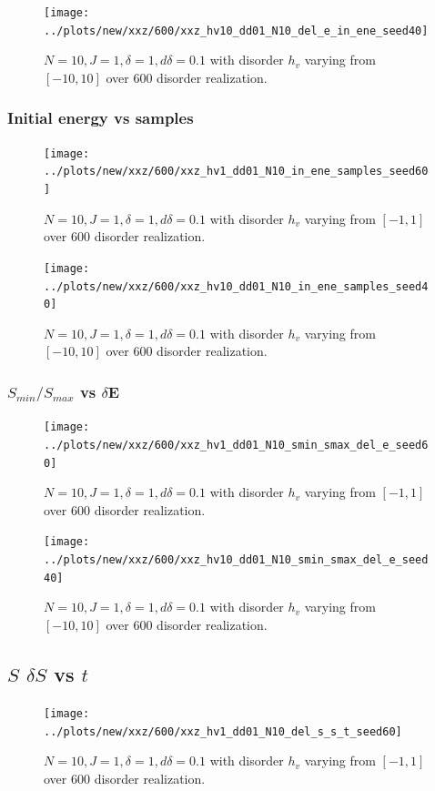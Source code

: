 \documentclass[a4paper]{article}
\begin{document}
\begin{figure}[h!]
  \centering
  \texttt{[image: ../plots/new/xxz/600/xxz\_hv10\_dd01\_N10\_del\_e\_in\_ene\_seed40]}
  \caption{$N = 10, J = 1, \delta = 1, d \delta =0.1$ with disorder $h_v$ varying from $[-10,10]$ over 600 disorder realization.}
  \label{fig:}
\end{figure}

\clearpage
\subsubsection{Initial energy vs samples}
\begin{figure}[h!]
  \centering
  \texttt{[image: ../plots/new/xxz/600/xxz\_hv1\_dd01\_N10\_in\_ene\_samples\_seed60]}
  \caption{$N = 10, J = 1, \delta = 1, d \delta =0.1$ with disorder $h_v$ varying from $[-1,1]$ over 600 disorder realization.}
  \label{fig:}
\end{figure}


\begin{figure}[h!]
  \centering
  \texttt{[image: ../plots/new/xxz/600/xxz\_hv10\_dd01\_N10\_in\_ene\_samples\_seed40]}
  \caption{$N = 10, J = 1, \delta = 1, d \delta =0.1$ with disorder $h_v$ varying from $[-10,10]$ over 600 disorder realization.}
  \label{fig:}
\end{figure}


\clearpage
\subsubsection{$S_{min}/S_{max}$ vs $\delta$E}
\begin{figure}[h!]
  \centering
  \texttt{[image: ../plots/new/xxz/600/xxz\_hv1\_dd01\_N10\_smin\_smax\_del\_e\_seed60]}
  \caption{$N = 10, J = 1, \delta = 1, d \delta =0.1$ with disorder $h_v$ varying from $[-1,1]$ over 600 disorder realization.}
  \label{fig:}
\end{figure}

\begin{figure}[h!]
  \centering
  \texttt{[image: ../plots/new/xxz/600/xxz\_hv10\_dd01\_N10\_smin\_smax\_del\_e\_seed40]}
  \caption{$N = 10, J = 1, \delta = 1, d \delta =0.1$ with disorder $h_v$ varying from $[-10,10]$ over 600 disorder realization.}
  \label{fig:}
\end{figure}

\clearpage
\subsection{$S$ $\delta S$ vs $t$}
\begin{figure}[h!]
  \centering
  \texttt{[image: ../plots/new/xxz/600/xxz\_hv1\_dd01\_N10\_del\_s\_s\_t\_seed60]}
  \caption{$N = 10, J = 1, \delta = 1, d \delta =0.1$ with disorder $h_v$ varying from $[-1,1]$ over 600 disorder realization.}
  \label{fig:}
\end{figure}
\end{document}
